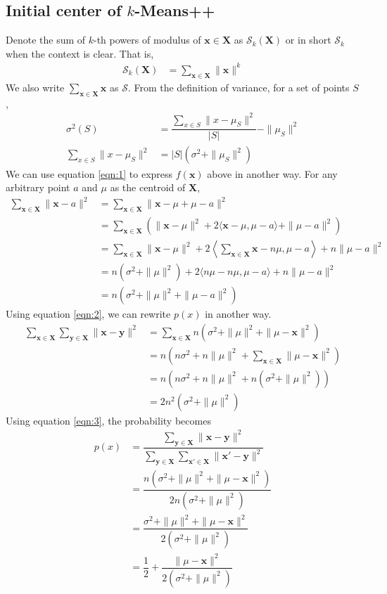 \documentclass[twoside, 11pt]{article}
\newcommand{\x}{\mathbf{x}}
\newcommand{\X}{\mathbf{X}}
\newcommand{\y}{\mathbf{y}}
\renewcommand{\S}{\mathcal{S}}
\begin{document}
	\subsection{Initial center of $k$-Means++}
	Denote the sum of $k$-th powers of modulus of $\x\in\X$ as $\S_k(\X)$ or in short $\S_k$ when the context is clear. That is,
		\begin{align*}
			\S_k(\X) & = \sum_{\x\in\X}\|\x\|^k
		\end{align*}
	We also write $\sum_{\x\in\X}\x$ as $\S$. From the definition of variance, for a set of points $S$,
		\begin{align}
			\sigma^2(S) & = \dfrac{\sum_{x\in S} \|x-\mu_{S}\|^2}{|S|}-\|\mu_{S}\|^2\nonumber\\
			\sum_{x\in S}\|x-\mu_{S}\|^2 & = |S|(\sigma^2+\|\mu_{S}\|^2)\label{eqn:1}
		\end{align}
	We can use equation \eqref{eqn:1} to express $f(\x)$ above in another way. For any arbitrary point $a$ and $\mu$ as the centroid of $\X$,
		\begin{align}
			\sum_{\x\in\X}\|\x-a\|^2
				  & = \sum_{\x\in\X}\|\x-\mu+\mu-a\|^2\nonumber\\
				  & = \sum_{\x\in\X}\left(\|\x-\mu\|^2+2\langle\x-\mu,\mu-a\rangle+\|\mu-a\|^2\right)\nonumber\\
				  & = \sum_{\x\in\X}\|\x-\mu\|^2+2\left\langle\sum_{\x\in\X}\x-n\mu,\mu-a\right\rangle+n\|\mu-a\|^2\nonumber\\
				  & = n(\sigma^2+\|\mu\|^2)+2\langle n\mu-n\mu,\mu-a\rangle+n\|\mu-a\|^2\nonumber\\
				  & = n(\sigma^2+\|\mu\|^2+\|\mu-a\|^2)\label{eqn:2}
		\end{align}
	Using equation \eqref{eqn:2}, we can rewrite $p(x)$ in another way.
		\begin{align}
			\sum_{\x\in\X}\sum_{\y\in\X}\|\x-\y\|^2 
				& = \sum_{\x\in\X}n(\sigma^2+\|\mu\|^2+\|\mu-\x\|^2)\nonumber\\
				& = n(n\sigma^2+n\|\mu\|^2+\sum_{\x\in\X}\|\mu-\x\|^2)\nonumber\\
				& = n(n\sigma^2+n\|\mu\|^2+n(\sigma^2+\|\mu\|^2))\nonumber\\
				& = 2n^2(\sigma^2+\|\mu\|^2)\label{eqn:3}
		\end{align}
	Using equation \eqref{eqn:3}, the probability becomes
		\begin{align*}
			p(x) & = \dfrac{\sum_{\y\in\X}\|\x-\y\|^2}{\sum_{\y\in\X}\sum_{\x'\in\X}\|\x'-\y\|^2}\\
				 & = \dfrac{n(\sigma^2+\|\mu\|^2+\|\mu-\x\|^2)}{2n(\sigma^2+\|\mu\|^2)}\\
				 & = \dfrac{\sigma^2+\|\mu\|^2+\|\mu-\x\|^2}{2(\sigma^2+\|\mu\|^2)}\\
				 & = \dfrac{1}{2}+\dfrac{\|\mu-\x\|^2}{2(\sigma^2+\|\mu\|^2)}
		\end{align*}
\end{document}
